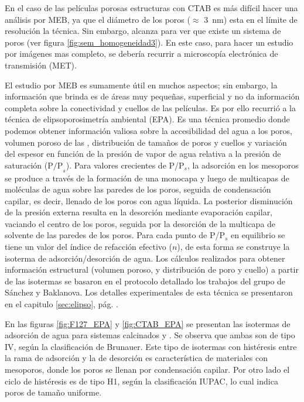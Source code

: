 		 En el caso de las películas porosas estructuras con CTAB es más difícil hacer una análisis por MEB, ya que el diámetro de los poros ($\approx$ \SI{3}{\nm}) esta en el límite de resolución la técnica. Sin embargo, alcanza para  ver que existe un sistema de poros (ver figura \ref{fig:sem_homogeneidad3}). En este caso, para hacer un estudio por imágenes mas completo, se debería recurrir a microscopía electrónica de transmisión (MET).

		 El estudio por MEB es sumamente útil en muchos aspectos; sin embargo, la información que brinda es de áreas muy pequeñas, superficial y no da información completa sobre la conectividad y cuellos de las películas. Es por ello recurrió a la técnica de elipsoporosimetría ambiental (EPA). Es una técnica promedio donde podemos obtener información valiosa sobre la accesibilidad del agua a los poros, volumen poroso de las \pdm, distribución de tamaños de poros y cuellos y variación del espesor en función de la presión de vapor de agua relativa a la presión de saturación ($\text{P/P}_s$). Para valores crecientes de P/P$_s$, la adsorción en los mesoporos se produce a través de la formación de una monocapa y luego de multicapas de moléculas de agua sobre las paredes de los poros, seguida de condensación capilar, es decir, llenado de los poros con agua líquida. La posterior disminución de la presión externa resulta en la desorción mediante evaporación capilar, vaciando el centro de los poros, seguida por la desorción de la multicapa de solvente de las paredes de los poros. Para cada punto de P/P$_s$ en equilibrio se tiene un valor del índice de refacción efectivo ($n$), de esta forma se construye la isoterma de adsorción/desorción de agua. Los cálculos realizados para obtener información estructural (volumen poroso, y distribución de poro y cuello) a partir de las isotermas se basaron en el protocolo detallado los trabajos del grupo de Sánchez y Baklanova\cite{Baklanov2000,Boissiere2005,Sakatani2006}. Los detalles experimentales de esta técnica se presentaron en el capitulo \ref{sec:elipso}, pág. \pageref{sec:elipso}.

		 En las figuras \ref{fig:F127_EPA} y \ref{fig:CTAB_EPA} se presentan las isotermas de adsorción de agua para sistemas calcinados \pdmF\space y \pdmC. Se observa que ambas son de tipo IV, según la clasificación de Brunauer\cite{Gregg1967,Violi2015,Fuertes2010}. Este tipo de isotermas con histéresis entre la rama de adsorción y la de desorción es característica de materiales con mesoporos, donde los poros se llenan por condensación capilar. Por otro lado el ciclo de histéresis es de tipo H1, según la clasificación IUPAC, lo cual indica poros de tamaño uniforme.\cite{Gregg1967,Lowell2004,Sing1985a}

